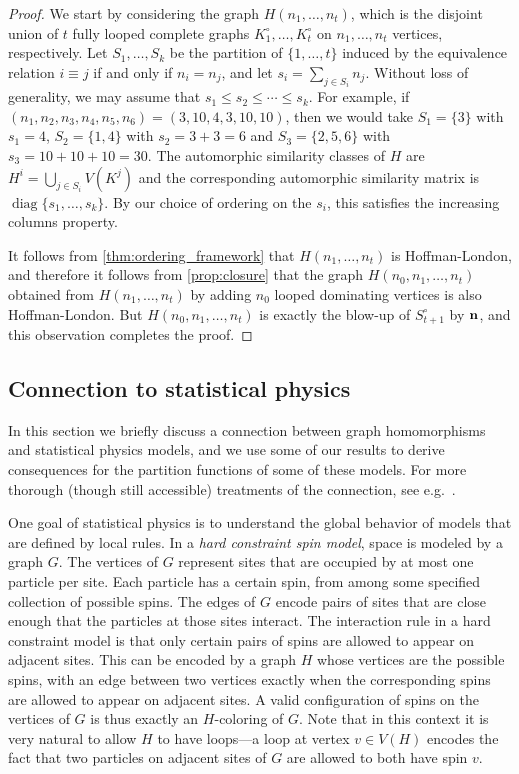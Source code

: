 \documentclass[11pt]{article}
\theoremstyle{definition}
\renewcommand{\loop}{\circ}
\DeclareMathOperator{\diag}{diag}
\begin{document}
\begin{proof}
We start by considering the graph $H(n_1, \ldots, n_t)$, which is the disjoint union of $t$ fully looped complete graphs $K^\loop_1, \ldots, K^\loop_t$ on $n_1, \ldots, n_t$ vertices, respectively. Let $S_1, \ldots, S_k$ be the partition of $\{1, \ldots, t\}$ induced by the equivalence relation $i \equiv j$ if and only if $n_i=n_j$, and let $s_i=\sum_{j \in S_i} n_j$. Without loss of generality, we may assume that $s_1 \le s_2 \le \cdots \le s_k$. For example, if $(n_1, n_2, n_3, n_4, n_5, n_6)=(3,10,4,3,10,10)$, then we would take $S_1=\{3\}$ with $s_1=4$, $S_2=\{1,4\}$ with $s_2=3+3=6$ and $S_3=\{2,5,6\}$ with $s_3=10+10+10=30$. The automorphic similarity classes of $H$ are $H^i=\bigcup_{j \in S_i} V(K^j)$ and the corresponding automorphic similarity matrix is $\diag\{s_1, \ldots, s_k\}$. By our choice of ordering on the $s_i$, this satisfies the increasing columns property. 

It follows from \cref{thm:ordering_framework} that $H(n_1, \ldots, n_t)$ is Hoffman-London, and therefore it follows from \cref{prop:closure} that the graph $H(n_0, n_1, \ldots, n_t)$ obtained from $H(n_1, \ldots, n_t)$ by adding $n_0$ looped dominating vertices is also Hoffman-London. But $H(n_0,n_1, \ldots, n_t)$ is exactly the blow-up of $S_{t+1}^\circ$ by ${\bf n}$, and this observation completes the proof. 
\end{proof}

\subsection{Connection to statistical physics} \label{sec:stat-phys}

In this section we briefly discuss a connection between graph homomorphisms and statistical physics models, and we use some of our results to derive consequences for the partition functions of some of these models. For more thorough (though still accessible) treatments of the connection, see e.g.~\cite{BrightwellWinkler1999, BrightwellWinkler2002, delaHarpeJones1993}.

One goal of statistical physics is to understand the global behavior of models that are defined by local rules. In a {\it hard constraint spin model}, space is modeled by a graph $G$. The vertices of $G$ represent sites that are occupied by at most one particle per site. Each particle has a certain spin, from among some specified collection of possible spins. The edges of $G$ encode pairs of sites that are close enough that the particles at those sites interact. The interaction rule in a hard constraint model is that only certain pairs of spins are allowed to appear on adjacent sites. This can be encoded by a graph $H$ whose vertices are the possible spins, with an edge between two vertices exactly when the corresponding spins are allowed to appear on adjacent sites. A valid configuration of spins on the vertices of $G$ is thus exactly an $H$-coloring of $G$. Note that in this context it is very natural to allow $H$ to have loops---a loop at vertex $v \in V(H)$ encodes the fact that two particles on adjacent sites of $G$ are allowed to both have spin $v$.
\end{document}
